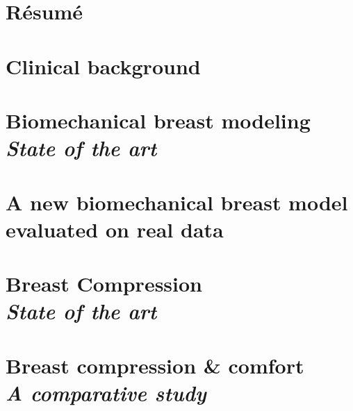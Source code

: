 \documentclass[a4paper,12pt,twoside]{report}
\begin{document}
\clearemptydoublepage

\chapter*{Résumé}


\chapter{ Clinical background}\label{chapter:clinicalbachground}


\clearemptydoublepage

\chapter{Biomechanical breast modeling\\ \textit{State of the art}}\label{chapter:bioMecaModelsBackground}


\clearemptydoublepage
\chapter{A new biomechanical breast model evaluated on real data}\label{chapter:myBioMecaModel}




\clearemptydoublepage
\chapter{Breast Compression\\ \textit{State of the art} }\label{chapter:compression:introduction}

\clearemptydoublepage

\chapter{Breast compression \& comfort \\ \textit{A comparative study}}
\label{chapter:compressionfem}

\end{document}
